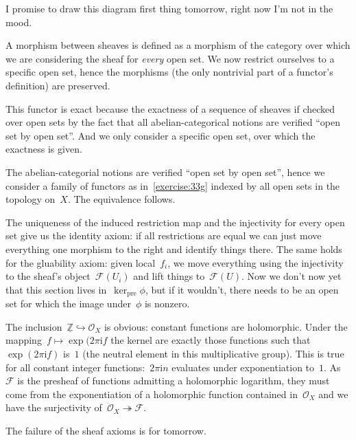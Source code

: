 \begin{exercise} %
  I promise to draw this diagram first thing tomorrow, right now I'm not in the mood.
\end{exercise}

\begin{exercise}
  \label{exercise:33g}
  A morphism between sheaves is defined as a morphism of the category over which we are considering the sheaf for \emph{every} open set. We now restrict ourselves to a specific open set, hence the morphisms (the only nontrivial part of a functor's definition) are preserved. 

  This functor is exact because the exactness of a sequence of sheaves if checked over open sets by the fact that all abelian-categorical notions are verified ``open set by open set''. And we only consider a specific open set, over which the exactness is given.
\end{exercise}

\begin{exercise}
  The abelian-categorial notions are verified ``open set by open set'', hence we consider a family of functors as in~\autoref{exercise:33g} indexed by all open sets in the topology on~$X$. The equivalence follows.
\end{exercise}

\begin{exercise} %
  The uniqueness of the induced restriction map and the injectivity for every open set give us the identity axiom: if all restrictions are equal we can just move everything one morphism to the right and identify things there. The same holds for the gluability axiom: given local~$f_i$, we move everything using the injectivity to the sheaf's object~$\mathcal{F}(U_i)$ and lift things to~$\mathcal{F}(U)$. Now we don't now yet that this section lives in~$\ker_{\textrm{pre}}\phi$, but if it wouldn't, there needs to be an open set for which the image under~$\phi$ is nonzero. %
\end{exercise}

\begin{exercise} %
  The inclusion~$\underline{\mathbb{Z}}\hookrightarrow\mathcal{O}_X$ is obvious: constant functions are holomorphic. Under the mapping~$f\mapsto\exp(2\pi\mathrm{i}f$ the kernel are exactly those functions such that~$\exp(2\pi\mathrm{i}f)$ is~$1$ (the neutral element in this multiplicative group). This is true for all constant integer functions:~$2\pi\mathrm{i}n$ evaluates under exponentiation to~$1$. As~$\mathcal{F}$ is the presheaf of functions admitting a holomorphic logarithm, they must come from the exponentiation of a holomorphic function contained in~$\mathcal{O}_X$ and we have the surjectivity of~$\mathcal{O}_X\twoheadrightarrow\mathcal{F}$.

  The failure of the sheaf axioms is for tomorrow.
\end{exercise}


